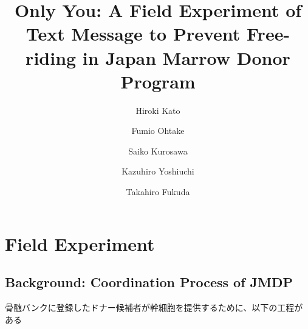 \documentclass[
  a4paperpaper,
]{article}
\title{Only You: A Field Experiment of Text Message to Prevent
Free-riding in Japan Marrow Donor Program}
\author{Hiroki Kato \and Fumio Ohtake \and Saiko Kurosawa \and Kazuhiro
Yoshiuchi \and Takahiro Fukuda}
\date{}
\begin{document}
\maketitle
\ifdefined\Shaded\renewenvironment{Shaded}{\begin{tcolorbox}[borderline west={3pt}{0pt}{shadecolor}, sharp corners, boxrule=0pt, enhanced, interior hidden, breakable, frame hidden]}{\end{tcolorbox}}\fi

\hypertarget{field-experiment}{%
\section{Field Experiment}\label{field-experiment}}

\hypertarget{background-coordination-process-of-jmdp}{%
\subsection{Background: Coordination Process of
JMDP}\label{background-coordination-process-of-jmdp}}

骨髄バンクに登録したドナー候補者が幹細胞を提供するために、以下の工程がある
\end{document}
